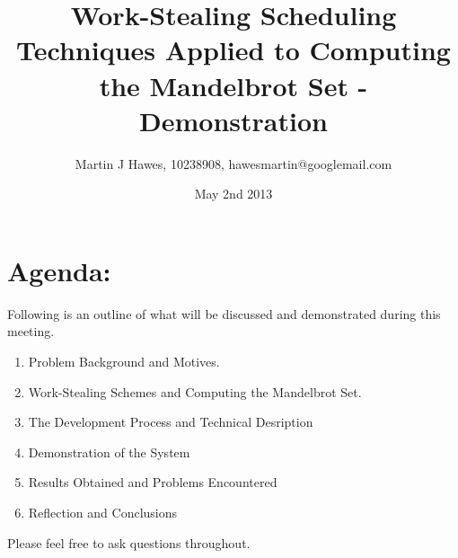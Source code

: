 \documentclass{article}[12pt]
\title{Work-Stealing Scheduling Techniques Applied to Computing the Mandelbrot Set - Demonstration}
\author{Martin J Hawes, 10238908, hawesmartin@googlemail.com}
\date{May 2nd 2013}
\begin{document}
\maketitle

\section*{Agenda:}

Following is an outline of what will be discussed and demonstrated during this meeting.

\begin{enumerate}
\item Problem Background and Motives.
\item Work-Stealing Schemes and Computing the Mandelbrot Set.
\item The Development Process and Technical Desription
\item Demonstration of the System
\item Results Obtained and Problems Encountered
\item Reflection and Conclusions
\end{enumerate}

Please feel free to ask questions throughout.
\end{document}

